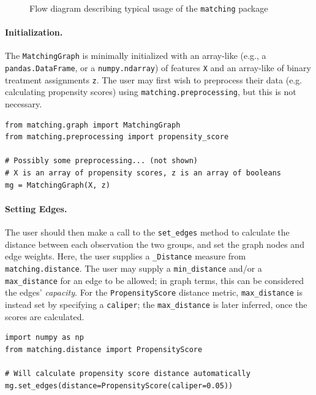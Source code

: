 \documentclass[11pt]{extarticle}
\begin{document}
\begin{figure}[h!]
  \caption{\label{fig:matching_usage} Flow diagram describing typical usage of the \texttt{matching} package}
\end{figure}

\paragraph{Initialization.} 
The \texttt{MatchingGraph} is minimally initialized with an array-like (e.g., a \texttt{pandas.DataFrame}, or a \texttt{numpy.ndarray}) of features \texttt{X} and an array-like of binary treatment assignments \texttt{z}. The user may first wish to preprocess their data (e.g. calculating propensity scores) using \texttt{matching.preprocessing}, but this is not necessary.
\begin{verbatim}
from matching.graph import MatchingGraph
from matching.preprocessing import propensity_score

# Possibly some preprocessing... (not shown)
# X is an array of propensity scores, z is an array of booleans
mg = MatchingGraph(X, z)
\end{verbatim}
\paragraph{Setting Edges.} The user should then make a call to the \texttt{set\_edges} method to calculate the distance between each observation the two groups, and set the graph nodes and edge weights. Here, the user supplies a \texttt{\_Distance} measure from \texttt{matching.distance}. The user may supply a \texttt{min\_distance} and/or a \texttt{max\_distance} for an edge to be allowed; in graph terms, this can be considered the edges' \emph{capacity}. For the \texttt{PropensityScore} distance metric, \texttt{max\_distance} is instead set by specifying a \texttt{caliper}; the \texttt{max\_distance} is later inferred, once the scores are calculated.
\begin{verbatim}
import numpy as np
from matching.distance import PropensityScore

# Will calculate propensity score distance automatically
mg.set_edges(distance=PropensityScore(caliper=0.05))
\end{verbatim}
\end{document}
